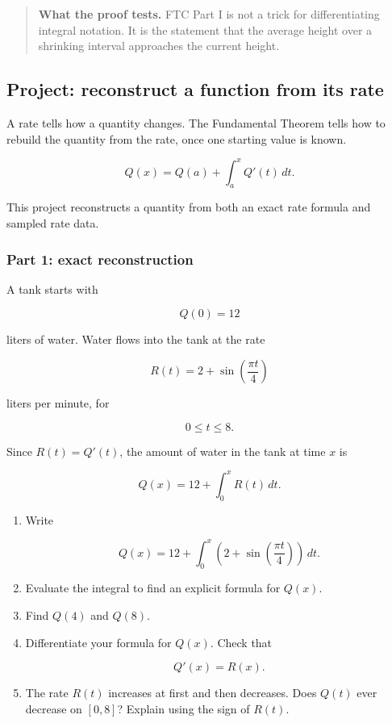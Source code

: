 \begin{quote}
\textbf{What the proof tests.}
FTC Part I is not a trick for differentiating integral notation.  It is the statement that
the average height over a shrinking interval approaches the current height.
\end{quote}

\subsection{Project: reconstruct a function from its rate}
\label{subsec:project-reconstruct-function-from-rate}

A rate tells how a quantity changes.  The Fundamental Theorem tells how to rebuild
the quantity from the rate, once one starting value is known.

\[
\boxed{
Q(x)=Q(a)+\int_a^x Q'(t)\,dt.
}
\]

This project reconstructs a quantity from both an exact rate formula and sampled rate
data.

\subsubsection*{Part 1: exact reconstruction}

A tank starts with

\[
Q(0)=12
\]

liters of water.  Water flows into the tank at the rate

\[
R(t)=2+\sin\left(\frac{\pi t}{4}\right)
\]

liters per minute, for

\[
0\le t\le 8.
\]

Since \(R(t)=Q'(t)\), the amount of water in the tank at time \(x\) is

\[
Q(x)=12+\int_0^x R(t)\,dt.
\]

\begin{enumerate}
\item Write

\[
Q(x)=12+\int_0^x
\left(
2+\sin\left(\frac{\pi t}{4}\right)
\right)\,dt.
\]

\item Evaluate the integral to find an explicit formula for \(Q(x)\).

\item Find \(Q(4)\) and \(Q(8)\).

\item Differentiate your formula for \(Q(x)\).  Check that

\[
Q'(x)=R(x).
\]

\item The rate \(R(t)\) increases at first and then decreases.  Does \(Q(t)\) ever
decrease on \([0,8]\)?  Explain using the sign of \(R(t)\).

\end{enumerate}

